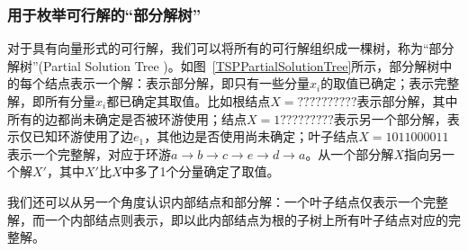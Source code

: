\subsubsection*{用于枚举可行解的“部分解树”} 
   对于具有向量形式的可行解，我们可以将所有的可行解组织成一棵树，称为“部分解树”(Partial Solution Tree \cite{PapadimitriouBook,ZhuBook})。如图~\ref{TSPPartialSolutionTree}所示，部分解树中的每个结点表示一个解：表示部分解，即只有一些分量$x_{i}$的取值已确定；表示完整解，即所有分量$x_{i}$都已确定其取值。比如根结点$X=??????????$表示部分解，其中所有的边都尚未确定是否被环游使用；结点$X=1?????????$表示另一个部分解，表示仅已知环游使用了边$e_{1}$，其他边是否使用尚未确定；叶子结点$X=1011000011$表示一个完整解，对应于环游$a\rightarrow b \rightarrow c \rightarrow e \rightarrow d  \rightarrow a$。从一个部分解$X$指向另一个解$X'$，其中$X'$比$X$中多了1个分量确定了取值。
   
   我们还可以从另一个角度认识内部结点和部分解：一个叶子结点仅表示一个完整解，而一个内部结点则表示，即以此内部结点为根的子树上所有叶子结点对应的完整解。
   	


